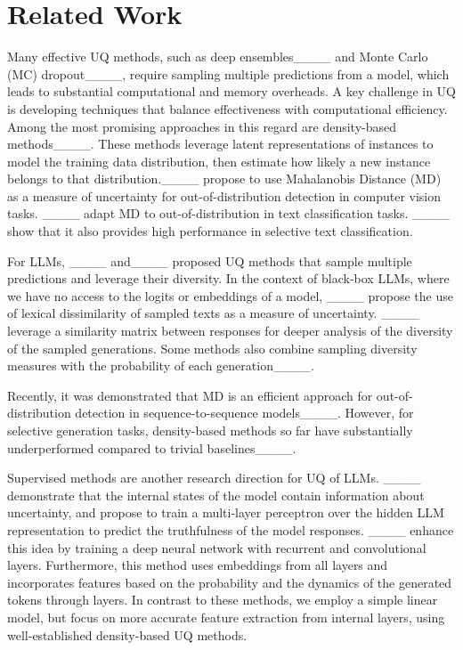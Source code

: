 \section{Related Work}
Many effective UQ methods, such as deep ensembles____ and Monte Carlo (MC) dropout____, require sampling multiple predictions from a model, which leads to substantial computational and memory overheads. A key challenge in UQ is developing techniques that balance effectiveness with computational efficiency. Among the most promising approaches in this regard are density-based methods____. These methods leverage latent representations of instances to model the training data distribution, then estimate how likely a new instance belongs to that distribution.____ propose to use Mahalanobis Distance (MD) as a measure of uncertainty for out-of-distribution detection in computer vision tasks. ____ adapt  MD  to out-of-distribution in text classification tasks. ____ show that it also provides high performance in selective text classification.  

  For LLMs, ____ and____ proposed UQ methods that sample multiple predictions and leverage their diversity. In the context of black-box LLMs, where we have no access to the logits or embeddings of a model, ____ propose the use of lexical dissimilarity of sampled texts as a measure of uncertainty. ____ leverage a similarity matrix between responses for deeper analysis of the diversity of the sampled generations. Some methods also combine sampling diversity measures with the probability of each generation____.

  Recently, it was demonstrated that MD is an efficient approach for out-of-distribution detection in sequence-to-sequence models____. However, for selective generation tasks, density-based methods so far have substantially underperformed compared to trivial baselines____.

  Supervised methods are another research direction for UQ of LLMs. ____ demonstrate that the internal states of the model contain information about uncertainty, and propose to train a multi-layer perceptron over the hidden LLM representation to predict the truthfulness of the model responses. ____ enhance this idea by training a deep neural network with recurrent and convolutional layers. Furthermore, this method uses embeddings from all layers and incorporates features based on the probability and the dynamics of the generated tokens through layers. In contrast to these methods, we employ a simple linear model, but focus on more accurate feature extraction from internal layers, using well-established density-based UQ methods.